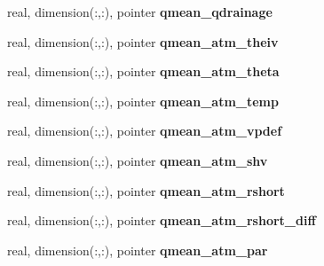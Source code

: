 \begin{DoxyCompactItemize}
\item 
\hypertarget{structed__state__vars_1_1edtype_a4dd9c6fc70183ff37938f4cb4d692342}{
real, dimension(:,:), pointer {\bfseries qmean\_\-qdrainage}}
\label{structed__state__vars_1_1edtype_a4dd9c6fc70183ff37938f4cb4d692342}

\item 
\hypertarget{structed__state__vars_1_1edtype_a84d4d6f79923d7111d31502a68bc6f92}{
real, dimension(:,:), pointer {\bfseries qmean\_\-atm\_\-theiv}}
\label{structed__state__vars_1_1edtype_a84d4d6f79923d7111d31502a68bc6f92}

\item 
\hypertarget{structed__state__vars_1_1edtype_a9b027110a91ecd7b46a8fe935c9f4cad}{
real, dimension(:,:), pointer {\bfseries qmean\_\-atm\_\-theta}}
\label{structed__state__vars_1_1edtype_a9b027110a91ecd7b46a8fe935c9f4cad}

\item 
\hypertarget{structed__state__vars_1_1edtype_a5a605436b890c36372f0c12ff478b4ec}{
real, dimension(:,:), pointer {\bfseries qmean\_\-atm\_\-temp}}
\label{structed__state__vars_1_1edtype_a5a605436b890c36372f0c12ff478b4ec}

\item 
\hypertarget{structed__state__vars_1_1edtype_a903e9b6b5fb74c2e20011e1be7f9bda4}{
real, dimension(:,:), pointer {\bfseries qmean\_\-atm\_\-vpdef}}
\label{structed__state__vars_1_1edtype_a903e9b6b5fb74c2e20011e1be7f9bda4}

\item 
\hypertarget{structed__state__vars_1_1edtype_ae0e77dd531f0a1fdba2a5426316bb280}{
real, dimension(:,:), pointer {\bfseries qmean\_\-atm\_\-shv}}
\label{structed__state__vars_1_1edtype_ae0e77dd531f0a1fdba2a5426316bb280}

\item 
\hypertarget{structed__state__vars_1_1edtype_a4c3c93461efe4ba4505533a190f1f4ef}{
real, dimension(:,:), pointer {\bfseries qmean\_\-atm\_\-rshort}}
\label{structed__state__vars_1_1edtype_a4c3c93461efe4ba4505533a190f1f4ef}

\item 
\hypertarget{structed__state__vars_1_1edtype_a872c58639b88237ebca09c3c3d516fb6}{
real, dimension(:,:), pointer {\bfseries qmean\_\-atm\_\-rshort\_\-diff}}
\label{structed__state__vars_1_1edtype_a872c58639b88237ebca09c3c3d516fb6}

\item 
\hypertarget{structed__state__vars_1_1edtype_a8abe9a4f9c1974d43b0b3658d46ef2b5}{
real, dimension(:,:), pointer {\bfseries qmean\_\-atm\_\-par}}
\label{structed__state__vars_1_1edtype_a8abe9a4f9c1974d43b0b3658d46ef2b5}


\end{DoxyCompactItemize}
